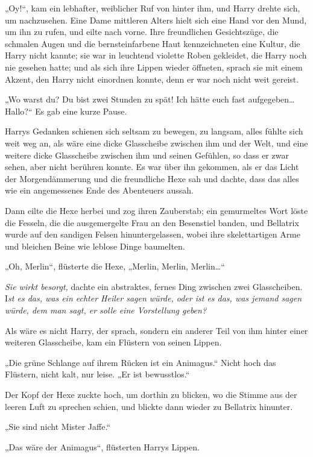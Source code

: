 {„Oy!“, kam ein lebhafter, weiblicher Ruf von hinter ihm, und Harry drehte sich, um nachzusehen. Eine Dame mittleren Alters hielt sich eine Hand vor den Mund, um ihn zu rufen, und eilte nach vorne. Ihre freundlichen Gesichtszüge, die schmalen Augen und die bernsteinfarbene Haut kennzeichneten eine Kultur, die Harry nicht kannte; sie war in leuchtend violette Roben gekleidet, die Harry noch nie gesehen hatte; und als sich ihre Lippen wieder öffneten, sprach sie mit einem Akzent, den Harry nicht einordnen konnte, denn er war noch nicht weit gereist.

„Wo warst du? Du bist zwei Stunden zu spät! Ich hätte euch fast aufgegeben…Hallo?“ Es gab eine kurze Pause.

Harrys Gedanken schienen sich seltsam zu bewegen, zu langsam, alles fühlte sich weit weg an, als wäre eine dicke Glasscheibe zwischen ihm und der Welt, und eine weitere dicke Glasscheibe zwischen ihm und seinen Gefühlen, so dass er zwar sehen, aber nicht berühren konnte. Es war über ihn gekommen, als er das Licht der Morgendämmerung und die freundliche Hexe sah und dachte, dass das alles wie ein angemessenes Ende des Abenteuers aussah.

Dann eilte die Hexe herbei und zog ihren Zauberstab; ein gemurmeltes Wort löste die Fesseln, die die ausgemergelte Frau an den Besenstiel banden, und Bellatrix wurde auf den sandigen Felsen hinuntergelassen, wobei ihre skelettartigen Arme und bleichen Beine wie leblose Dinge baumelten.

„Oh, Merlin“, flüsterte die Hexe, „Merlin, Merlin, Merlin…“

\emph{Sie wirkt besorgt,} dachte ein abstraktes, fernes Ding zwischen zwei Glasscheiben. I\emph{st es das, was ein echter Heiler sagen würde, oder ist es das, was jemand sagen würde, dem man sagt, er solle eine Vorstellung geben?}

Als wäre es nicht Harry, der sprach, sondern ein anderer Teil von ihm hinter einer weiteren Glasscheibe, kam ein Flüstern von seinen Lippen.

„Die grüne Schlange auf ihrem Rücken ist ein Animagus.“ Nicht hoch das Flüstern, nicht kalt, nur leise. „Er ist bewusstlos.“

Der Kopf der Hexe zuckte hoch, um dorthin zu blicken, wo die Stimme aus der leeren Luft zu sprechen schien, und blickte dann wieder zu Bellatrix hinunter.

„Sie sind nicht Mister Jaffe.“

„Das wäre der Animagus“, flüsterten Harrys Lippen.

}

